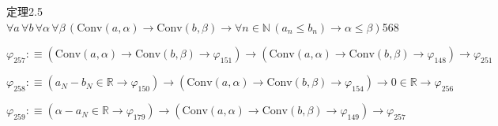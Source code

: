 \begin{fullproof}{定理2.5}{$\forall a\,\forall b\,\forall \alpha\,\forall \beta\,(\mathrm{Conv}(a,\alpha) \to \mathrm{Conv}(b,\beta) \to \forall n \in \mathbb{N}\,(a_{n} \leq b_{n}) \to \alpha \leq \beta)$}{568}
\begin{abbrevlist}
\item $\varphi_{257} :\equiv (\mathrm{Conv}(a,\alpha) \to \mathrm{Conv}(b,\beta) \to \varphi_{151}) \to (\mathrm{Conv}(a,\alpha) \to \mathrm{Conv}(b,\beta) \to \varphi_{148}) \to \varphi_{251}$
\item $\varphi_{258} :\equiv (a_{N} - b_{N} \in \mathbb{R} \to \varphi_{150}) \to (\mathrm{Conv}(a,\alpha) \to \mathrm{Conv}(b,\beta) \to \varphi_{154}) \to 0 \in \mathbb{R} \to \varphi_{256}$
\item $\varphi_{259} :\equiv (\alpha - a_{N} \in \mathbb{R} \to \varphi_{179}) \to (\mathrm{Conv}(a,\alpha) \to \mathrm{Conv}(b,\beta) \to \varphi_{149}) \to \varphi_{257}$
\end{abbrevlist}
\end{fullproof}
